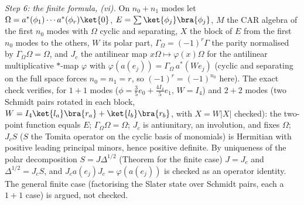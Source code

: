 \emph{Step 6: the finite formula, (vi).} On $n_{0} + n_{1}$ modes let $\Omega = a^{*}(\phi_{1})\cdots a^{*}(\phi_{r})\ket{0}$, $E = \sum\ket{\phi_{j}}\bra{\phi_{j}}$, $M$ the CAR algebra of the first $n_{0}$ modes with $\Omega$ cyclic and separating, $X$ the block of $E$ from the first $n_{0}$ modes to the others, $W$ its polar part, $\Gamma_{\Omega} = (-1)^{r}\Gamma$ the parity normalised by $\Gamma_{\Omega}\Omega = \Omega$, and $J_{c}$ the antilinear map $x\Omega \mapsto \varphi(x)\Omega$ for the antilinear multiplicative $*$-map $\varphi$ with $\varphi(a(e_{j})) = \Gamma_{\Omega}\,a^{*}(We_{j})$ (cyclic and separating on the full space forces $n_{0} = n_{1} = r$, so $(-1)^{r} = (-1)^{n_{0}}$ here). The exact check verifies, for $1 + 1$ modes ($\phi = \tfrac35e_{0} + \tfrac{4I_{4}}{5}e_{1}$, $W = I_{4}$) and $2 + 2$ modes (two Schmidt pairs rotated in each block, $W = I_{4}\ket{l_{a}}\bra{r_{a}} + \ket{l_{b}}\bra{r_{b}}$, with $X = W|X|$ checked): the two-point function equals $E$; $\Gamma_{\Omega}\Omega = \Omega$; $J_{c}$ is antiunitary, an involution, and fixes $\Omega$; $J_{c}S$ ($S$ the Tomita operator on the cyclic basis of monomials) is Hermitian with positive leading principal minors, hence positive definite. By uniqueness of the polar decomposition $S = J\Delta^{1/2}$ (Theorem  for the finite case) $J = J_{c}$ and $\Delta^{1/2} = J_{c}S$, and $J_{c}a(e_{j})J_{c} = \varphi(a(e_{j}))$ is checked as an operator identity. The general finite case (factorising the Slater state over Schmidt pairs, each a $1 + 1$ case) is argued, not checked.
